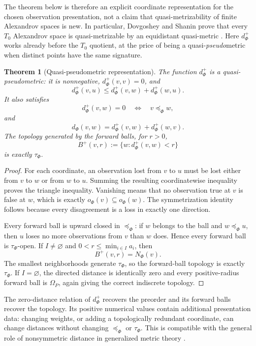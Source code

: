 \documentclass[11pt]{article}
\theoremstyle{definition}
\theoremstyle{plain}
\newtheorem{theorem}[definition]{Theorem}
\theoremstyle{remark}
\begin{document}
The theorem below is therefore an explicit coordinate representation for the
chosen observation presentation, not a claim that quasi-metrizability of finite
Alexandrov spaces is new.  In particular, Dovgoshey and Shanin prove that every
$T_0$ Alexandrov space is quasi-metrizable by an equidistant quasi-metric
\cite{DovgosheyShanin2026}.  Here $d_\Phi^+$ works already before the $T_0$
quotient, at the price of being a quasi-\emph{pseudo}metric when distinct points
have the same signature.

\begin{theorem}[Quasi-pseudometric representation]
The function $d_\Phi^+$ is a quasi-pseudometric: it is nonnegative,
$d_\Phi^+(v,v)=0$, and
\[
 d_\Phi^+(v,u)\leq d_\Phi^+(v,w)+d_\Phi^+(w,u).
\]
It also satisfies
\[
 d_\Phi^+(v,w)=0
 \quad\Longleftrightarrow\quad
 v\preceq_\Phi w,
\]
and
\[
 d_\Phi(v,w)=d_\Phi^+(v,w)+d_\Phi^+(w,v).
\]
The topology generated by the forward balls, for $r>0$,
\[
 B^+(v,r):=\{w:d_\Phi^+(v,w)<r\}
\]
is exactly $\tau_\Phi$.
\end{theorem}

\begin{proof}
For each coordinate, an observation lost from $v$ to $u$ must be lost either
from $v$ to $w$ or from $w$ to $u$.  Summing the resulting coordinatewise
inequality proves the triangle inequality.  Vanishing means that no observation
true at $v$ is false at $w$, which is exactly
$o_\Phi(v)\subseteq o_\Phi(w)$.  The symmetrization identity follows because every
disagreement is a loss in exactly one direction.

Every forward ball is upward closed in $\preceq_\Phi$: if $w$ belongs to the ball
and $w\preceq_\Phi u$, then $u$ loses no more observations from $v$ than $w$
does.  Hence every forward ball is $\tau_\Phi$-open.  If $I\neq\varnothing$ and
$0<r\leq\min_{i\in I} a_i$, then
\[
 B^+(v,r)=N_\Phi(v).
\]
The smallest neighborhoods generate $\tau_\Phi$, so the forward-ball topology is
exactly $\tau_\Phi$.  If $I=\varnothing$, the directed distance is identically zero and
every positive-radius forward ball is $\Omega_P$, again giving the correct
indiscrete topology.
\end{proof}

The zero-distance relation of $d_\Phi^+$ recovers the preorder and its forward
balls recover the topology.  Its positive numerical values contain additional
presentation data: changing weights, or adding a topologically redundant
coordinate, can change distances without changing $\preceq_\Phi$ or
$\tau_\Phi$.  This is compatible with the general role of nonsymmetric distance
in generalized metric theory \cite{Lawvere1973}.
\end{document}
